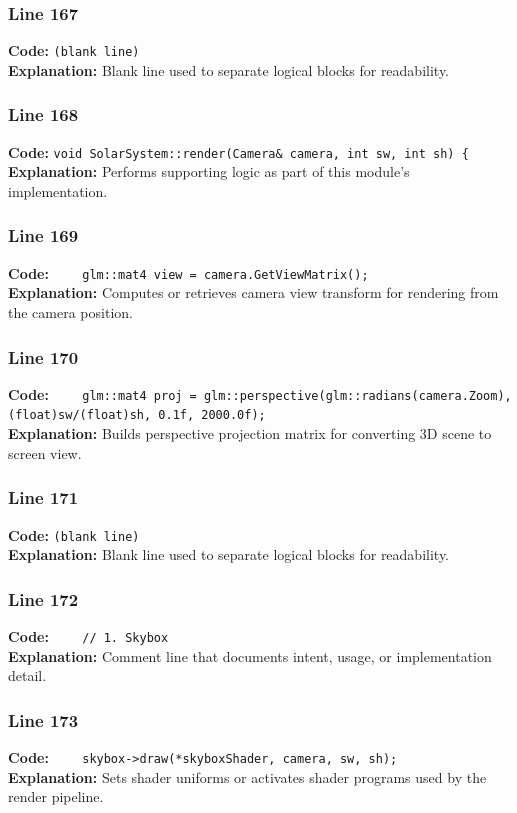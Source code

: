 \documentclass[11pt,a4paper]{article}
\begin{document}
\subsubsection*{Line 167}
\textbf{Code:} \texttt{(blank line)}\\
\textbf{Explanation:} Blank line used to separate logical blocks for readability.

\subsubsection*{Line 168}
\textbf{Code:} \verb|void SolarSystem::render(Camera& camera, int sw, int sh) {|\\
\textbf{Explanation:} Performs supporting logic as part of this module's implementation.

\subsubsection*{Line 169}
\textbf{Code:} \verb|    glm::mat4 view = camera.GetViewMatrix();|\\
\textbf{Explanation:} Computes or retrieves camera view transform for rendering from the camera position.

\subsubsection*{Line 170}
\textbf{Code:} \verb|    glm::mat4 proj = glm::perspective(glm::radians(camera.Zoom), (float)sw/(float)sh, 0.1f, 2000.0f);|\\
\textbf{Explanation:} Builds perspective projection matrix for converting 3D scene to screen view.

\subsubsection*{Line 171}
\textbf{Code:} \texttt{(blank line)}\\
\textbf{Explanation:} Blank line used to separate logical blocks for readability.

\subsubsection*{Line 172}
\textbf{Code:} \verb|    // 1. Skybox|\\
\textbf{Explanation:} Comment line that documents intent, usage, or implementation detail.

\subsubsection*{Line 173}
\textbf{Code:} \verb|    skybox->draw(*skyboxShader, camera, sw, sh);|\\
\textbf{Explanation:} Sets shader uniforms or activates shader programs used by the render pipeline.
\end{document}
